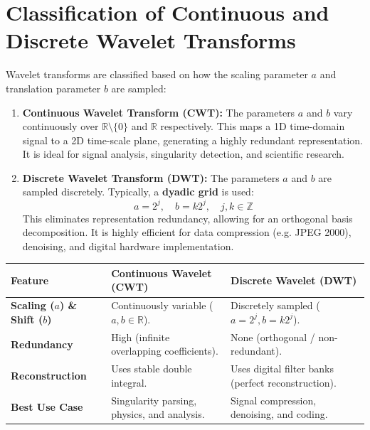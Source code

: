 \documentclass[12pt,a4paper]{article}
\renewcommand{\arraystretch}{1.45}
\begin{document}
\section{Classification of Continuous and Discrete Wavelet Transforms}

Wavelet transforms are classified based on how the scaling parameter $a$ and translation parameter $b$ are sampled:

\begin{enumerate}[leftmargin=*, itemsep=4pt]
  \item \textbf{Continuous Wavelet Transform (CWT):} The parameters $a$ and $b$ vary continuously over $\mathbb{R} \setminus \{0\}$ and $\mathbb{R}$ respectively. This maps a 1D time-domain signal to a 2D time-scale plane, generating a highly redundant representation. It is ideal for signal analysis, singularity detection, and scientific research.
  \item \textbf{Discrete Wavelet Transform (DWT):} The parameters $a$ and $b$ are sampled discretely. Typically, a \textbf{dyadic grid} is used:
        $$a = 2^j, \quad b = k 2^j, \quad j, k \in \mathbb{Z}$$
        This eliminates representation redundancy, allowing for an orthogonal basis decomposition. It is highly efficient for data compression (e.g. JPEG 2000), denoising, and digital hardware implementation.
\end{enumerate}

\par\noindent
{\renewcommand{\arraystretch}{1.4}%
\begin{tabularx}{\linewidth}{|B{3.5cm}|Y|Y|}
\hline
\textbf{Feature} & \textbf{Continuous Wavelet (CWT)} & \textbf{Discrete Wavelet (DWT)} \\
\hline
\textbf{Scaling ($a$) \& Shift ($b$)} & Continuously variable ($a,b \in \mathbb{R}$). & Discretely sampled ($a=2^j, b=k2^j$). \\
\hline
\textbf{Redundancy} & High (infinite overlapping coefficients). & None (orthogonal / non-redundant). \\
\hline
\textbf{Reconstruction} & Uses stable double integral. & Uses digital filter banks (perfect reconstruction). \\
\hline
\textbf{Best Use Case} & Singularity parsing, physics, and analysis. & Signal compression, denoising, and coding. \\
\hline
\end{tabularx}}
\end{document}
